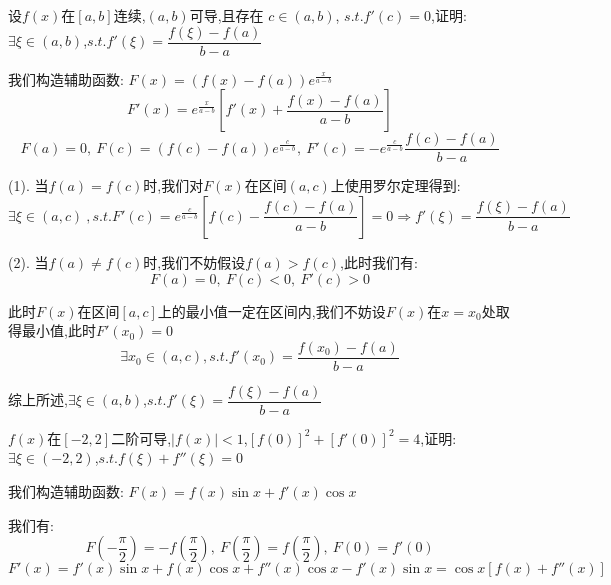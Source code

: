 
\begin{proposition}
	设$f(x)$在$[a,b]$连续,$(a,b)$可导,且存在 $c\in(a,b)$, $s.t. f'(c)=0$,证明: $\exists \xi\in(a,b)$,$s.t. f'(\xi)=\dfrac{f(\xi)-f(a)}{b-a}$
\end{proposition}
\begin{solution}

	我们构造辅助函数: $F(x)=(f(x)-f(a))e^{\frac{x}{a-b}}$
	$$F'(x)=e^{\frac{x}{a-b}}[f'(x)+\dfrac{f(x)-f(a)}{a-b}]$$
	$$F(a)=0,\ F(c)=(f(c)-f(a))e^{\frac{c}{a-b}},\ F'(c)=-e^{\frac{c}{a-b}}\dfrac{f(c)-f(a)}{b-a}$$

	(1). 当$f(a)=f(c)$时,我们对$F(x)$在区间$(a,c)$上使用罗尔定理得到:
	$$\exists \xi\in(a,c)\ ,s.t. F'(c)=e^{\frac{c}{a-b}}[f(c)-\dfrac{f(c)-f(a)}{a-b}]=0\Rightarrow f'(\xi)=\dfrac{f(\xi)-f(a)}{b-a}$$

	(2). 当$f(a)\neq f(c)$时,我们不妨假设$f(a)>f(c)$,此时我们有:
	$$F(a)=0,\ F(c)<0,\ F'(c)>0$$

	此时$F(x)$在区间$[a,c]$上的最小值一定在区间内,我们不妨设$F(x)$在$x=x_{0}$处取得最小值,此时$F'(x_{0})=0$
	$$\exists x_{0}\in(a,c), s.t. f'(x_{0})=\dfrac{f(x_{0})-f(a)}{b-a}$$

	综上所述,$\exists \xi\in(a,b)$,$s.t. f'(\xi)=\dfrac{f(\xi)-f(a)}{b-a}$
\end{solution}


\begin{proposition}
	$f(x)$在$[-2,2]$二阶可导,$|f(x)|<1$,$[f(0)]^{2}+[f'(0)]^{2}=4$,证明: $\exists \xi\in(-2,2)$,$s.t. f(\xi)+f''(\xi)=0$
\end{proposition}
\begin{solution}

	我们构造辅助函数: $F(x)=f(x)\sin x+f'(x)\cos x$

	我们有: $$F(-\frac{\pi}{2})=-f(\frac{\pi}{2}),\ F(\frac{\pi}{2})=f(\frac{\pi}{2}),\ F(0)=f'(0)$$
	$$F'(x)=f'(x)\sin x+f(x)\cos x+f''(x)\cos x-f'(x)\sin x=\cos x[f(x)+f''(x)]$$
\end{solution}


